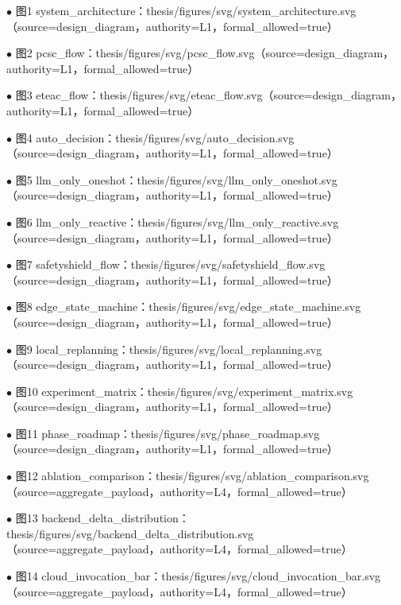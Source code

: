 \noindent $\bullet$ 图1 system\_architecture：thesis/figures/svg/system\_architecture.svg（source=design\_diagram，authority=L1，formal\_allowed=true）\par
\noindent $\bullet$ 图2 pcsc\_flow：thesis/figures/svg/pcsc\_flow.svg（source=design\_diagram，authority=L1，formal\_allowed=true）\par
\noindent $\bullet$ 图3 eteac\_flow：thesis/figures/svg/eteac\_flow.svg（source=design\_diagram，authority=L1，formal\_allowed=true）\par
\noindent $\bullet$ 图4 auto\_decision：thesis/figures/svg/auto\_decision.svg（source=design\_diagram，authority=L1，formal\_allowed=true）\par
\noindent $\bullet$ 图5 llm\_only\_oneshot：thesis/figures/svg/llm\_only\_oneshot.svg（source=design\_diagram，authority=L1，formal\_allowed=true）\par
\noindent $\bullet$ 图6 llm\_only\_reactive：thesis/figures/svg/llm\_only\_reactive.svg（source=design\_diagram，authority=L1，formal\_allowed=true）\par
\noindent $\bullet$ 图7 safetyshield\_flow：thesis/figures/svg/safetyshield\_flow.svg（source=design\_diagram，authority=L1，formal\_allowed=true）\par
\noindent $\bullet$ 图8 edge\_state\_machine：thesis/figures/svg/edge\_state\_machine.svg（source=design\_diagram，authority=L1，formal\_allowed=true）\par
\noindent $\bullet$ 图9 local\_replanning：thesis/figures/svg/local\_replanning.svg（source=design\_diagram，authority=L1，formal\_allowed=true）\par
\noindent $\bullet$ 图10 experiment\_matrix：thesis/figures/svg/experiment\_matrix.svg（source=design\_diagram，authority=L1，formal\_allowed=true）\par
\noindent $\bullet$ 图11 phase\_roadmap：thesis/figures/svg/phase\_roadmap.svg（source=design\_diagram，authority=L1，formal\_allowed=true）\par
\noindent $\bullet$ 图12 ablation\_comparison：thesis/figures/svg/ablation\_comparison.svg（source=aggregate\_payload，authority=L4，formal\_allowed=true）\par
\noindent $\bullet$ 图13 backend\_delta\_distribution：thesis/figures/svg/backend\_delta\_distribution.svg（source=aggregate\_payload，authority=L4，formal\_allowed=true）\par
\noindent $\bullet$ 图14 cloud\_invocation\_bar：thesis/figures/svg/cloud\_invocation\_bar.svg（source=aggregate\_payload，authority=L4，formal\_allowed=true）\par
